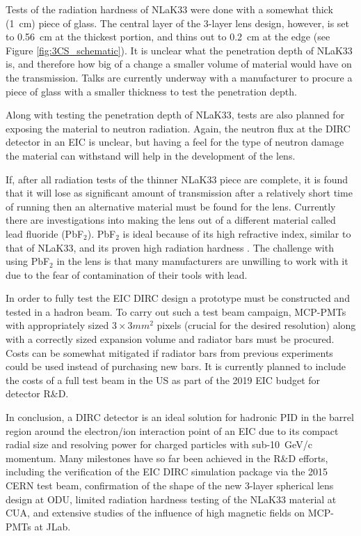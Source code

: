 Tests of the radiation hardness of NLaK33 were done with a somewhat thick (1~cm) piece of glass. The central layer of the 3-layer lens design, however, is set to 0.56~cm at the thickest portion, and thins out to 0.2~cm at the edge (see Figure \ref{fig:3CS_schematic}). It is unclear what the penetration depth of NLaK33 is, and therefore how big of a change a smaller volume of material would have on the transmission. Talks are currently underway with a manufacturer to procure a piece of glass with a smaller thickness to test the penetration depth.

Along with testing the penetration depth of NLaK33, tests are also planned for exposing the material to neutron radiation. Again, the neutron flux at the DIRC detector in an EIC is unclear, but having a feel for the type of neutron damage the material can withstand will help in the development of the lens.

If, after all radiation tests of the thinner NLaK33 piece are complete, it is found that it will lose as significant amount of transmission after a relatively short time of running then an alternative material must be found for the lens. Currently there are investigations into making the lens out of a different material called lead fluoride (PbF$_2$). PbF$_2$ is ideal because of its high refractive index, similar to that of NLaK33, and its proven high radiation hardness \cite{PbF2RadHard}. The challenge with using PbF$_2$ in the lens is that many manufacturers are unwilling to work with it due to the fear of contamination of their tools with lead.

In order to fully test the EIC DIRC design a prototype must be constructed and tested in a hadron beam. To carry out such a test beam campaign, MCP-PMTs with appropriately sized $3\times3\unit{mm}^2$ pixels (crucial for the desired resolution) along with a correctly sized expansion volume and radiator bars must be procured. Costs can be somewhat mitigated if radiator bars from previous experiments could be used instead of purchasing new bars. It is currently planned to include the costs of a full test beam in the US as part of the 2019 EIC budget for detector R\&D.

In conclusion, a DIRC detector is an ideal solution for hadronic PID in the barrel region around the electron/ion interaction point of an EIC due to its compact radial size and resolving power for charged particles with sub-10~GeV/c momentum. Many milestones have so far been achieved in the R\&D efforts, including the verification of the EIC DIRC simulation package via the 2015 CERN test beam, confirmation of the shape of the new 3-layer spherical lens design at ODU, limited radiation hardness testing of the NLaK33 material at CUA, and extensive studies of the influence of high magnetic fields on MCP-PMTs at JLab. 